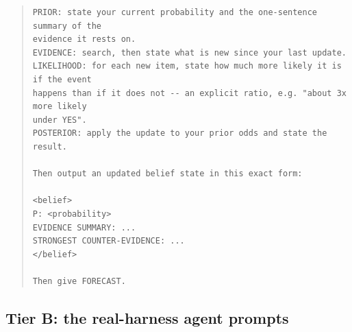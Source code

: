 \documentclass[10pt]{article}
\begin{document}
\begin{quote}
\begin{verbatim}
PRIOR: state your current probability and the one-sentence summary of the
evidence it rests on.
EVIDENCE: search, then state what is new since your last update.
LIKELIHOOD: for each new item, state how much more likely it is if the event
happens than if it does not -- an explicit ratio, e.g. "about 3x more likely
under YES".
POSTERIOR: apply the update to your prior odds and state the result.

Then output an updated belief state in this exact form:

<belief>
P: <probability>
EVIDENCE SUMMARY: ...
STRONGEST COUNTER-EVIDENCE: ...
</belief>

Then give FORECAST.
\end{verbatim}\end{quote}

\subsection{Tier B: the real-harness agent prompts}
\end{document}
